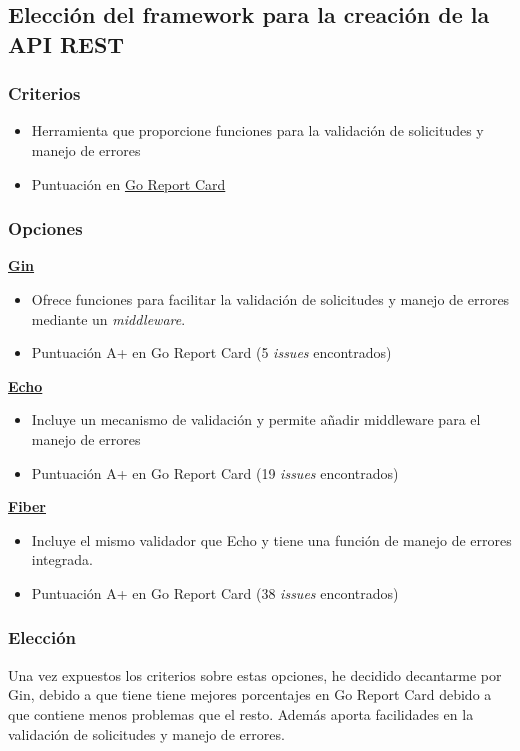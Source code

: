 \subsection{Elección del framework para la creación de la API REST}

\subsubsection{Criterios}

\begin{itemize}
\item
  Herramienta que proporcione funciones para la validación de solicitudes y manejo de errores
\item
  Puntuación en \href{https://goreportcard.com/}{Go Report Card}
\end{itemize}

\subsubsection{Opciones}

\textbf{\href{https://pkg.go.dev/github.com/gin-gonic/gin}{Gin}}

\begin{itemize}
\item
  Ofrece funciones para facilitar la validación de solicitudes y manejo de errores mediante un \textit{middleware}.
\item
  Puntuación A+ en Go Report Card (5 \textit{issues} encontrados)
\end{itemize}

\textbf{\href{https://pkg.go.dev/github.com/labstack/echo/v4}{Echo}}

\begin{itemize}
\item
  Incluye un mecanismo de validación y permite añadir middleware para el manejo de errores
\item
Puntuación A+ en Go Report Card (19 \textit{issues} encontrados)
\end{itemize}

\textbf{\href{https://pkg.go.dev/github.com/gofiber/fiber/v2}{Fiber}}

\begin{itemize}
\item
  Incluye el mismo validador que Echo y tiene una función de manejo de errores integrada.
\item
Puntuación A+ en Go Report Card (38 \textit{issues} encontrados)
\end{itemize}

\subsubsection{Elección}

Una vez expuestos los criterios sobre estas opciones, he decidido decantarme por Gin, debido a que tiene tiene mejores porcentajes en Go Report Card debido a que contiene menos problemas que el resto.
Además aporta facilidades en la validación de solicitudes y manejo de errores.

